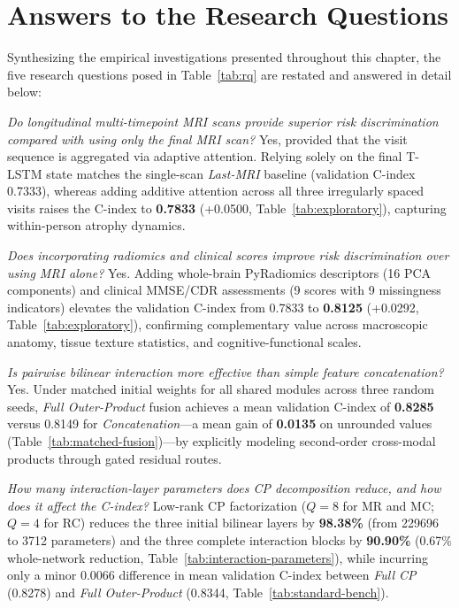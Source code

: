 \section{Answers to the Research Questions}
\label{sec:rq-results}
Synthesizing the empirical investigations presented throughout this chapter, the five research questions posed in Table~\ref{tab:rq} are restated and answered in detail below:

\begin{description}[leftmargin=1.35cm,labelwidth=1.1cm,itemsep=.4em]
\item[RQ1.] \emph{Do longitudinal multi-timepoint MRI scans provide superior risk discrimination compared with using only the final MRI scan?} Yes, provided that the visit sequence is aggregated via adaptive attention. Relying solely on the final T-LSTM state matches the single-scan \emph{Last-MRI} baseline (validation C-index 0.7333), whereas adding additive attention across all three irregularly spaced visits raises the C-index to \textbf{0.7833} (+0.0500, Table~\ref{tab:exploratory}), capturing within-person atrophy dynamics.
\item[RQ2.] \emph{Does incorporating radiomics and clinical scores improve risk discrimination over using MRI alone?} Yes. Adding whole-brain PyRadiomics descriptors (16 PCA components) and clinical MMSE/CDR assessments (9 scores with 9 missingness indicators) elevates the validation C-index from 0.7833 to \textbf{0.8125} (+0.0292, Table~\ref{tab:exploratory}), confirming complementary value across macroscopic anatomy, tissue texture statistics, and cognitive-functional scales.
\item[RQ3.] \emph{Is pairwise bilinear interaction more effective than simple feature concatenation?} Yes. Under matched initial weights for all shared modules across three random seeds, \emph{Full Outer-Product} fusion achieves a mean validation C-index of \textbf{0.8285} versus 0.8149 for \emph{Concatenation}---a mean gain of \textbf{0.0135} on unrounded values (Table~\ref{tab:matched-fusion})---by explicitly modeling second-order cross-modal products through gated residual routes.
\item[RQ4.] \emph{How many interaction-layer parameters does CP decomposition reduce, and how does it affect the C-index?} Low-rank CP factorization ($Q=8$ for MR and MC; $Q=4$ for RC) reduces the three initial bilinear layers by \textbf{98.38\%} (from 229696 to 3712 parameters) and the three complete interaction blocks by \textbf{90.90\%} (0.67\% whole-network reduction, Table~\ref{tab:interaction-parameters}), while incurring only a minor 0.0066 difference in mean validation C-index between \emph{Full CP} (0.8278) and \emph{Full Outer-Product} (0.8344, Table~\ref{tab:standard-bench}).

\end{description}
